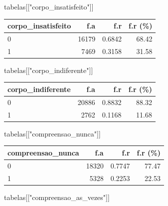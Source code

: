 \documentclass[
]{article}
\newenvironment{Shaded}{\begin{snugshade}}{\end{snugshade}}
\newcommand{\NormalTok}[1]{\textcolor[rgb]{0.00,0.23,0.31}{#1}}
\newcommand{\StringTok}[1]{\textcolor[rgb]{0.13,0.47,0.30}{#1}}
\begin{document}
\begin{Shaded}
\begin{Highlighting}[]
\NormalTok{tabelas[[}\StringTok{"corpo\_insatisfeito"}\NormalTok{]]}
\end{Highlighting}
\end{Shaded}

\begin{longtable}[]{@{}lrrr@{}}
\toprule()
corpo\_insatisfeito & f.a & f.r & f.r (\%) \\
\midrule()
\endhead
0 & 16179 & 0.6842 & 68.42 \\
1 & 7469 & 0.3158 & 31.58 \\
\bottomrule()
\end{longtable}

\begin{Shaded}
\begin{Highlighting}[]
\NormalTok{tabelas[[}\StringTok{"corpo\_indiferente"}\NormalTok{]]}
\end{Highlighting}
\end{Shaded}

\begin{longtable}[]{@{}lrrr@{}}
\toprule()
corpo\_indiferente & f.a & f.r & f.r (\%) \\
\midrule()
\endhead
0 & 20886 & 0.8832 & 88.32 \\
1 & 2762 & 0.1168 & 11.68 \\
\bottomrule()
\end{longtable}

\begin{Shaded}
\begin{Highlighting}[]
\NormalTok{tabelas[[}\StringTok{"compreensao\_nunca"}\NormalTok{]]}
\end{Highlighting}
\end{Shaded}

\begin{longtable}[]{@{}lrrr@{}}
\toprule()
compreensao\_nunca & f.a & f.r & f.r (\%) \\
\midrule()
\endhead
0 & 18320 & 0.7747 & 77.47 \\
1 & 5328 & 0.2253 & 22.53 \\
\bottomrule()
\end{longtable}

\begin{Shaded}
\begin{Highlighting}[]
\NormalTok{tabelas[[}\StringTok{"compreensao\_as\_vezes"}\NormalTok{]]}
\end{Highlighting}
\end{Shaded}
\end{document}
